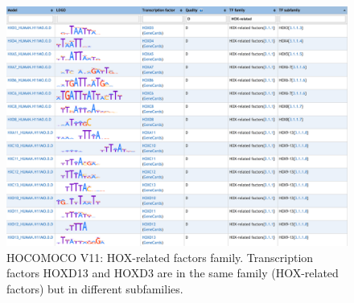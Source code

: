 \begin{center}
\begin{figure}[h!]
\includegraphics[width=16cm]{images/HOCOMOCO.png}
\caption[HOCOMOCO: HOX-related factors family]{\label{tab:hocomoco}HOCOMOCO V11: HOX-related factors family. Transcription factors HOXD13 and HOXD3 are in the same family (HOX-related factors) but in different subfamilies.}
\end{figure}
\end{center}
